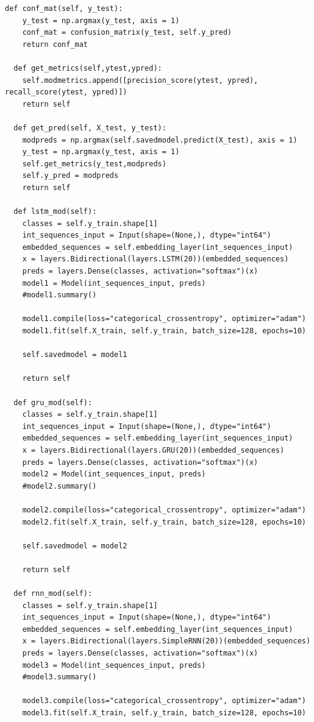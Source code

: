 \documentclass[12pt]{article}
\begin{document}
\begin{lstlisting}[breaklines]
  def conf_mat(self, y_test):
    y_test = np.argmax(y_test, axis = 1)
    conf_mat = confusion_matrix(y_test, self.y_pred)
    return conf_mat

  def get_metrics(self,ytest,ypred):
    self.modmetrics.append([precision_score(ytest, ypred), recall_score(ytest, ypred)])
    return self

  def get_pred(self, X_test, y_test):
    modpreds = np.argmax(self.savedmodel.predict(X_test), axis = 1)
    y_test = np.argmax(y_test, axis = 1)
    self.get_metrics(y_test,modpreds)
    self.y_pred = modpreds
    return self

  def lstm_mod(self):
    classes = self.y_train.shape[1]
    int_sequences_input = Input(shape=(None,), dtype="int64")
    embedded_sequences = self.embedding_layer(int_sequences_input)
    x = layers.Bidirectional(layers.LSTM(20))(embedded_sequences)
    preds = layers.Dense(classes, activation="softmax")(x)
    model1 = Model(int_sequences_input, preds)
    #model1.summary()

    model1.compile(loss="categorical_crossentropy", optimizer="adam")
    model1.fit(self.X_train, self.y_train, batch_size=128, epochs=10)
    
    self.savedmodel = model1

    return self

  def gru_mod(self):
    classes = self.y_train.shape[1]    
    int_sequences_input = Input(shape=(None,), dtype="int64")
    embedded_sequences = self.embedding_layer(int_sequences_input)
    x = layers.Bidirectional(layers.GRU(20))(embedded_sequences)
    preds = layers.Dense(classes, activation="softmax")(x)
    model2 = Model(int_sequences_input, preds)
    #model2.summary()

    model2.compile(loss="categorical_crossentropy", optimizer="adam")
    model2.fit(self.X_train, self.y_train, batch_size=128, epochs=10)
    
    self.savedmodel = model2

    return self

  def rnn_mod(self):
    classes = self.y_train.shape[1]
    int_sequences_input = Input(shape=(None,), dtype="int64")
    embedded_sequences = self.embedding_layer(int_sequences_input)
    x = layers.Bidirectional(layers.SimpleRNN(20))(embedded_sequences)
    preds = layers.Dense(classes, activation="softmax")(x)
    model3 = Model(int_sequences_input, preds)
    #model3.summary()

    model3.compile(loss="categorical_crossentropy", optimizer="adam")
    model3.fit(self.X_train, self.y_train, batch_size=128, epochs=10)


\end{lstlisting}
\end{document}

